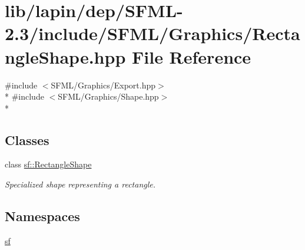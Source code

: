 \hypertarget{lapin_2dep_2_s_f_m_l-2_83_2include_2_s_f_m_l_2_graphics_2_rectangle_shape_8hpp}{\section{lib/lapin/dep/\-S\-F\-M\-L-\/2.3/include/\-S\-F\-M\-L/\-Graphics/\-Rectangle\-Shape.hpp File Reference}
\label{lapin_2dep_2_s_f_m_l-2_83_2include_2_s_f_m_l_2_graphics_2_rectangle_shape_8hpp}
}
{\ttfamily \#include $<$S\-F\-M\-L/\-Graphics/\-Export.\-hpp$>$}\\*
{\ttfamily \#include $<$S\-F\-M\-L/\-Graphics/\-Shape.\-hpp$>$}\\*
\subsection*{Classes}
\begin{DoxyCompactItemize}
\item 
class \hyperlink{classsf_1_1_rectangle_shape}{sf\-::\-Rectangle\-Shape}
\begin{DoxyCompactList}\small\item\em Specialized shape representing a rectangle. \end{DoxyCompactList}\end{DoxyCompactItemize}
\subsection*{Namespaces}
\begin{DoxyCompactItemize}
\item 
\hyperlink{namespacesf}{sf}
\end{DoxyCompactItemize}
